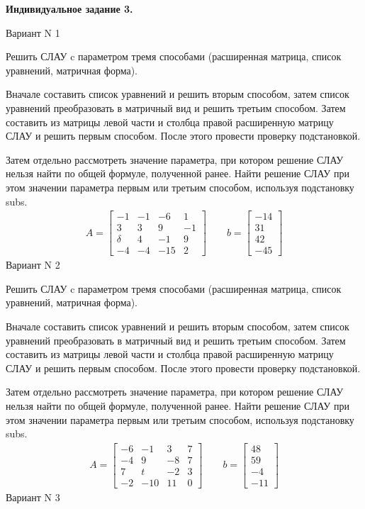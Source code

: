\documentclass[11pt]{report}
\begin{document}
\pagestyle{empty}

{\bf Индивидуальное задание 3.}


Вариант N 1


Решить СЛАУ c параметром тремя способами (расширенная матрица, список уравнений, матричная форма).

Вначале составить список уравнений и решить вторым способом,
затем список уравнений преобразовать в матричный вид и решить третьим способом.
Затем составить из матрицы левой части и столбца правой расширенную матрицу СЛАУ и решить первым способом.
После этого провести проверку подстановкой.

Затем отдельно рассмотреть значение параметра, при котором решение СЛАУ нельзя найти по общей формуле,
полученной ранее.
Найти решение СЛАУ при этом значении параметра первым или третьим способом, используя подстановку subs.
\begin{align*}
    A = \left[\begin{matrix}-1 & -1 & -6 & 1\\3 & 3 & 9 & -1\\\delta & 4 & -1 & 9\\-4 & -4 & -15 & 2\end{matrix}\right]
\qquad b = \left[\begin{matrix}-14\\31\\42\\-45\end{matrix}\right]
\end{align*}
\newpage
Вариант N 2


Решить СЛАУ c параметром тремя способами (расширенная матрица, список уравнений, матричная форма).

Вначале составить список уравнений и решить вторым способом,
затем список уравнений преобразовать в матричный вид и решить третьим способом.
Затем составить из матрицы левой части и столбца правой расширенную матрицу СЛАУ и решить первым способом.
После этого провести проверку подстановкой.

Затем отдельно рассмотреть значение параметра, при котором решение СЛАУ нельзя найти по общей формуле,
полученной ранее.
Найти решение СЛАУ при этом значении параметра первым или третьим способом, используя подстановку subs.
\begin{align*}
    A = \left[\begin{matrix}-6 & -1 & 3 & 7\\-4 & 9 & -8 & 7\\7 & t & -2 & 3\\-2 & -10 & 11 & 0\end{matrix}\right]
\qquad b = \left[\begin{matrix}48\\59\\-4\\-11\end{matrix}\right]
\end{align*}
\newpage
Вариант N 3
\end{document}
